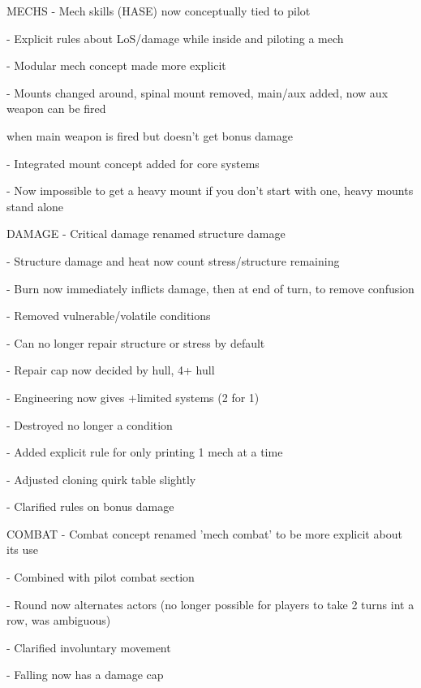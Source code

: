 MECHS  
    -    Mech skills (HASE) now conceptually tied to pilot
 

    -    Explicit rules about LoS/damage while inside and piloting a mech
 
    -    Modular mech concept made more explicit
 
    -    Mounts changed around, spinal mount removed, main/aux added, now aux weapon can be fired  

         when main weapon is fired but doesn't get bonus damage
 
    -    Integrated mount concept added for core systems
 
    -    Now impossible to get a heavy mount if you don't start with one, heavy mounts stand alone
 

DAMAGE  
    -    Critical damage renamed structure damage
 

    -    Structure damage and heat now count stress/structure remaining
 
    -    Burn now immediately inflicts damage, then at end of turn, to remove confusion
 
    -    Removed vulnerable/volatile conditions
 

    -    Can no longer repair structure or stress by default
 
    -    Repair cap now decided by hull, 4+ hull
 
    -    Engineering now gives +limited systems (2 for 1)
 

    -    Destroyed no longer a condition
 
    -    Added explicit rule for only printing 1 mech at a time
 
    -    Adjusted cloning quirk table slightly
 

    -    Clarified rules on bonus damage
 

COMBAT  
    -    Combat concept renamed 'mech combat' to be more explicit about its use
 
    -    Combined with pilot combat section
 

    -    Round now alternates actors (no longer possible for players to take 2 turns int a row, was  
         ambiguous)
 
    -    Clarified involuntary movement
 

                                                                                                                          


     -   Falling now has a damage cap
 
